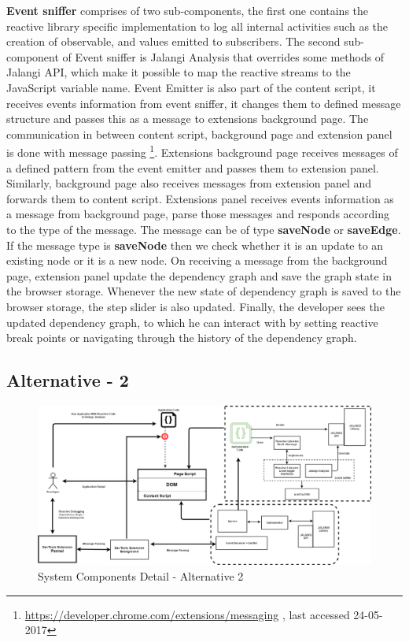 \textbf{Event sniffer} comprises of two sub-components,
the first one contains the reactive library specific implementation to log all internal activities such as the creation of observable, and values emitted to subscribers.
The second sub-component of Event sniffer is Jalangi Analysis that overrides some methods of Jalangi API, which make it possible to map the reactive streams to the JavaScript variable name.
Event Emitter is also part of the content script, it receives events information from event sniffer, it changes them to defined message structure and passes this as a message to extension\textquotesingle s background page.
The communication in between content script, background page and extension panel is done with message passing  \footnote{\url{https://developer.chrome.com/extensions/messaging} , last accessed 24-05-2017}. 
Extension\textquotesingle s background page receives messages of a defined pattern from the event emitter and passes them to extension panel.
Similarly, background page also receives messages from extension panel and forwards them to content script.
Extension\textquotesingle s panel receives events information as a message from background page, parse those messages and responds according to the type of the message.
The message can be of type \textbf{saveNode} or \textbf{saveEdge}. If the message type is \textbf{saveNode} then we check whether it is an update to an existing node or it is a new node.
On receiving a message from the background page, extension panel update the dependency graph and save the graph state in the browser storage. Whenever the new state of dependency graph is saved to the browser storage, the step slider is also updated.
Finally, the developer sees the updated dependency graph, to which he can interact with by setting reactive break points or navigating through the history of the dependency graph. 







\subsection{Alternative - 2}  \label{subsec:Alternative_2}





\begin{figure}[!h]
	\centering
	\includegraphics[width=\textwidth,height=\textheight,keepaspectratio]{gfx/SystemFlowDiagramDesign2.png}
	\caption{System Components Detail - Alternative 2}
	\label{fig:system_implementation_detail_2}
\end{figure}

